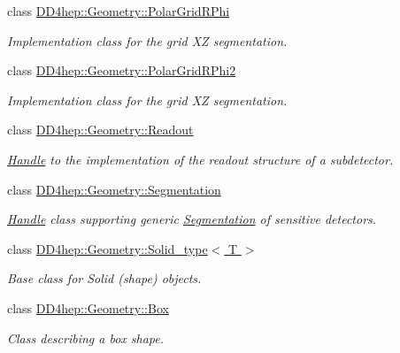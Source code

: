 \begin{DoxyCompactItemize}
class \hyperlink{class_d_d4hep_1_1_geometry_1_1_polar_grid_r_phi}{DD4hep::Geometry::PolarGridRPhi}
\begin{DoxyCompactList}\small\item\em Implementation class for the grid XZ segmentation. \item\end{DoxyCompactList}\item 
class \hyperlink{class_d_d4hep_1_1_geometry_1_1_polar_grid_r_phi2}{DD4hep::Geometry::PolarGridRPhi2}
\begin{DoxyCompactList}\small\item\em Implementation class for the grid XZ segmentation. \item\end{DoxyCompactList}\item 
class \hyperlink{class_d_d4hep_1_1_geometry_1_1_readout}{DD4hep::Geometry::Readout}
\begin{DoxyCompactList}\small\item\em \hyperlink{class_d_d4hep_1_1_handle}{Handle} to the implementation of the readout structure of a subdetector. \item\end{DoxyCompactList}\item 
class \hyperlink{class_d_d4hep_1_1_geometry_1_1_segmentation}{DD4hep::Geometry::Segmentation}
\begin{DoxyCompactList}\small\item\em \hyperlink{class_d_d4hep_1_1_handle}{Handle} class supporting generic \hyperlink{class_d_d4hep_1_1_geometry_1_1_segmentation}{Segmentation} of sensitive detectors. \item\end{DoxyCompactList}\item 
class \hyperlink{class_d_d4hep_1_1_geometry_1_1_solid__type}{DD4hep::Geometry::Solid\_\-type$<$ T $>$}
\begin{DoxyCompactList}\small\item\em Base class for Solid (shape) objects. \item\end{DoxyCompactList}\item 
class \hyperlink{class_d_d4hep_1_1_geometry_1_1_box}{DD4hep::Geometry::Box}
\begin{DoxyCompactList}\small\item\em Class describing a box shape. \item\end{DoxyCompactList}\item 

\end{DoxyCompactItemize}
